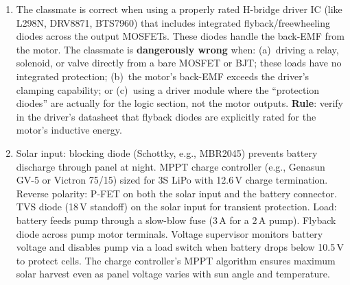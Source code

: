 \begin{enumerate}[leftmargin=1.5em]
  \item The classmate is correct when using a properly rated H-bridge driver IC (like L298N, DRV8871, BTS7960) that includes integrated flyback/freewheeling diodes across the output MOSFETs. These diodes handle the back-EMF from the motor. The classmate is \textbf{dangerously wrong} when: (a)~driving a relay, solenoid, or valve directly from a bare MOSFET or BJT; these loads have no integrated protection; (b)~the motor's back-EMF exceeds the driver's clamping capability; or (c)~using a driver module where the ``protection diodes'' are actually for the logic section, not the motor outputs. \textbf{Rule}: verify in the driver's datasheet that flyback diodes are explicitly rated for the motor's inductive energy.

  \item Solar input: blocking diode (Schottky, e.g., MBR2045) prevents battery discharge through panel at night. MPPT charge controller (e.g., Genasun GV-5 or Victron 75/15) sized for 3S LiPo with 12.6\,V charge termination. Reverse polarity: P-FET on both the solar input and the battery connector. TVS diode (18\,V standoff) on the solar input for transient protection. Load: battery feeds pump through a slow-blow fuse (3\,A for a 2\,A pump). Flyback diode across pump motor terminals. Voltage supervisor monitors battery voltage and disables pump via a load switch when battery drops below 10.5\,V to protect cells. The charge controller's MPPT algorithm ensures maximum solar harvest even as panel voltage varies with sun angle and temperature.
\end{enumerate}




